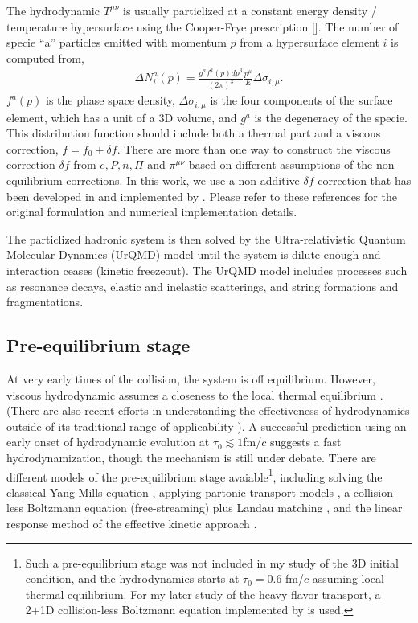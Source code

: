 The hydrodynamic $T^{\mu\nu}$ is usually particlized at a constant energy density / temperature hypersurface using the Cooper-Frye prescription [].
The number of specie ``a'' particles emitted with momentum $p$ from a hypersurface element $i$ is computed from,
\begin{eqnarray}
\Delta N_i^a(p) = \frac{g^a f^a(p) dp^3}{(2\pi)^3}  \frac{p^{\mu}}{E} \Delta \sigma_{i,\mu}.
\end{eqnarray}
$f^a(p)$ is the phase space density, $\Delta \sigma_{i,\mu}$ is the four components of the surface element, which has a unit of a 3D volume, and $g^a$ is the degeneracy of the specie.
This distribution function should include both a thermal part and a viscous correction, $f = f_0 + \delta f$.
There are more than one way to construct the viscous correction $\delta f$  from $e, P, n, \Pi$ and $\pi^{\mu\nu}$ based on different assumptions of the non-equilibrium corrections.
In this work, we use a non-additive $\delta f$ correction that has been developed in \cite{Pratt:2010jt,Pratt:2014vja} and implemented by \cite{Bernhard:2018hnz}.
Please refer to these references for the original formulation and numerical implementation details.

The particlized hadronic system is then solved by the Ultra-relativistic Quantum Molecular Dynamics (UrQMD) model \cite{Bass:1998ca,Bleicher:1999xi} until the system is dilute enough and interaction ceases (kinetic freezeout). 
The UrQMD model includes processes such as resonance decays, elastic and inelastic scatterings, and string formations and fragmentations.

\subsection{Pre-equilibrium stage}
At very early times of the collision, the system is off equilibrium. 
However, viscous hydrodynamic assumes a closeness to the local thermal equilibrium . (There are also recent efforts in understanding the effectiveness of hydrodynamics outside of its traditional range of applicability \cite{PhysRevLett.115.072501,Romatschke:2017vte,Strickland:2019jut}).
A successful prediction using an early onset of hydrodynamic evolution at $\tau_0\lesssim 1$fm/$c$ suggests a fast hydrodynamization, though the mechanism is still under debate. 
There are different models of the pre-equilibrium stage avaiable\footnote{Such a pre-equilibrium stage was not included in my study of the 3D initial condition, and the hydrodynamics starts at $\tau_0 = 0.6$ fm/$c$ assuming local thermal equilibrium. For my later study of the heavy flavor transport, a 2+1D collision-less Boltzmann equation implemented by \cite{Bernhard:2018hnz} is used.}, including solving the classical Yang-Mills equation \cite{Schenke:2012wb,Schenke:2016ksl}, applying partonic transport models \cite{PhysRevC.97.034915}, a collision-less Boltzmann equation (free-streaming) plus Landau matching \cite{Liu:2015nwa}, and the linear response method of the effective kinetic approach \cite{Kurkela:2018wud}.

